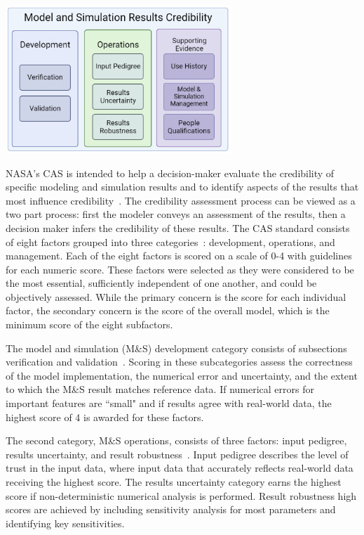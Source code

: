 \documentclass[12pt]{report}
\begin{document}
\begin{center}
    \captionsetup{type=figure}
    \includegraphics[width=8.5cm]{images/NASA_CAS.png}
    \label{fig:NASA}
\end{center}


NASA's CAS is intended to help a decision-maker evaluate the credibility of specific modeling and simulation results and to identify aspects of the results that most influence credibility~\cite{blattnig_towards_2008, Blattnig2013-qx}. The credibility assessment process can be viewed as a two part process: first the modeler conveys an assessment of the results, then a decision maker infers the credibility of these results. The CAS standard consists of eight factors grouped into three categories~\cite{babula_nasa_2009}: development, operations, and management. Each of the eight factors is scored on a scale of 0-4 with guidelines for each numeric score. These factors were selected as they were considered to be the most essential, sufficiently independent of one another, and could be objectively assessed. While the primary concern is the score for each individual factor, the secondary concern is the score of the overall model, which is the minimum score of the eight subfactors. 

The model and simulation (M\&S) development category consists of subsections verification and validation~\cite{babula_nasa_2009}. Scoring in these subcategories assess the correctness of the model implementation, the numerical error and uncertainty, and the extent to which the M\&S result matches reference data. If numerical errors for important features are ``small" and if results agree with real-world data, the highest score of 4 is awarded for these factors.

The second category, M\&S operations, consists of three factors: input pedigree, results uncertainty, and result robustness~\cite{babula_nasa_2009}. Input pedigree describes the level of trust in the input data, where input data that accurately reflects real-world data receiving the highest score. The results uncertainty category earns the highest score if non-deterministic numerical analysis is performed. Result robustness high scores are achieved by including sensitivity analysis for most parameters and identifying key sensitivities.
\end{document}
